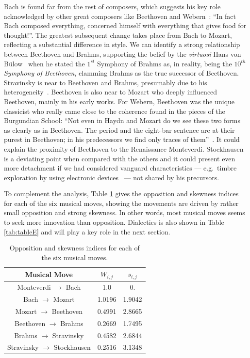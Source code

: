\documentclass[
 aip,
 jmp,
 amsmath,amssymb,
 reprint,
]{revtex4-1}
\begin{document}
Bach is found far from the rest of
composers, which suggests his key role
acknowledged by other great composers like Beethoven and
Webern~\cite{Webern}: ``In fact Bach composed everything, concerned
himself with everything that gives food for thought!''. 
The greatest subsequent change takes place from Bach to Mozart,
reflecting a substantial difference in style.
We can identify a strong relationship between
Beethoven and Brahms, supporting the belief by the \textit{virtuosi} Hans von B\"{u}low~\cite{Bulow} when he
stated the $1^{st}$ Symphony of Brahms as, in reality, being the \textit{$10^{th}$ Symphony of
Beethoven}, clamming Brahms as the true successor of
Beethoven. Stravinsky is near to Beethoven and Brahms,
presumably due to his heterogeneity~\cite{BennettHistory,
  Lovelock}. Beethoven is also near to Mozart who deeply influenced
Beethoven, mainly in his early works.
For Webern, Beethoven was the unique classicist who really came close
to the coherence found in the pieces of the Burgundian School: ``Not even
in Haydn and Mozart do we see these two forms as clearly as in
Beethoven. The period and the eight-bar sentence are at their purest
in Beethoven; in his predecessors we find only traces of them''~\cite{Webern}. It
could explain the proximity of Beethoven to the Renaissance  Monteverdi.
Stockhausen is a deviating point when compared with the others and it
could present even more detachment if we had considered
vanguard characteristics --- e.g.\ timbre exploration by using
electronic devices~\cite{Lovelock} --- not
shared by his precursors.

To complement the analysis, Table \ref{tab:tableOI} gives the
opposition and skewness indices for each of the six musical moves,
showing the movements are driven by rather small opposition and strong
skewness. In other words, most musical moves seems to seek more innovation
than opposition. Dialectics is also shown in Table
\ref{tab:tableE} and will play a key role in the next section.

\begin{table}[ht]
\caption{\label{tab:tableOI}Opposition and skewness indices for each
of the six musical moves.}

\begin{tabular}{|c||c|c|}
\hline
Musical Move & $W_{i,j}$ & $s_{i,j}$ \\
\hline \hline

 Monteverdi $\to$ Bach             &   1.0     &  0.      \\
 Bach $\to$ Mozart                 &   1.0196  &  1.9042  \\
 Mozart $\to$ Beethoven            &   0.4991  &  2.8665  \\
 Beethoven $\to$ Brahms            &   0.2669  &  1.7495  \\
 Brahms $\to$ Stravinsky           &   0.4582  &  2.6844  \\
 Stravinsky $\to$ Stockhausen      &   0.2516  &  3.1348  \\

\hline
\end{tabular}
\end{table}
\end{document}
